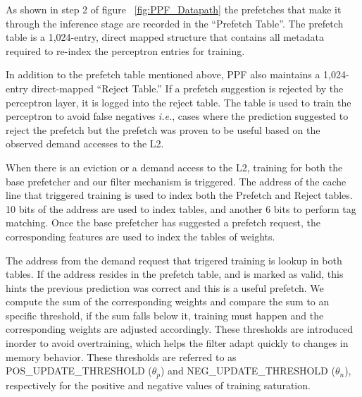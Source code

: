\newline 

As shown in step 2 of figure ~\ref{fig:PPF_Datapath}
the prefetches that make it through the inference stage are recorded in the 
``Prefetch Table''. The prefetch table is a 1,024-entry, direct mapped 
structure that contains all metadata required to re-index the perceptron 
entries for training. 

In addition to the prefetch table mentioned above, 
PPF also maintains a 1,024-entry direct-mapped ``Reject Table.'' 
If a prefetch suggestion is rejected by the perceptron layer, it is logged into 
the reject table. The table is used to train the perceptron to avoid false negatives 
\textit{i.e.}, cases where the prediction suggested to reject the prefetch 
but the prefetch was proven to be useful based 
on the observed demand accesses to the L2. \newline

 \newline

When there is an eviction or a demand access to the L2, training for both the base 
prefetcher and our filter mechanism is triggered. 
The address of the cache line that triggered training is used to index
both the Prefetch and Reject tables. 10 bits of the address are used to index 
tables, and another 6 bits to perform tag matching. 
Once the base prefetcher has suggested a prefetch request, the corresponding 
features are used to index the tables of weights. \newline


\newline

The address from the demand request that trigered training is lookup in 
both tables. If the address resides in the prefetch table, and is marked 
as valid, this hints the previous prediction was correct and this is a useful
prefetch. We compute the sum of the corresponding weights and
compare the sum to an specific threshold, if the sum falls below it, 
training must happen and the corresponding weights are adjusted accordingly.
These thresholds are introduced inorder to avoid overtraining, 
which helps the filter adapt quickly to changes in memory behavior. 
These thresholds are referred to as
POS\_UPDATE\_THRESHOLD ($\theta_p$) and \newline
NEG\_UPDATE\_THRESHOLD ($\theta_n$),
respectively for the positive and negative values of training saturation.

